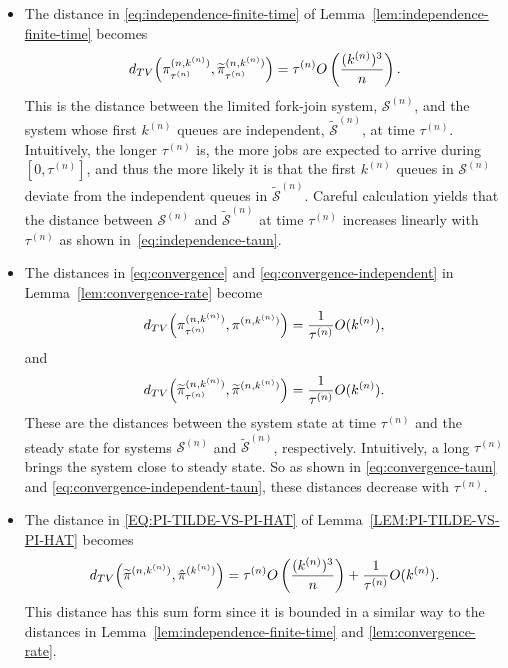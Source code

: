 \documentclass[sigconf]{acmart}
\newcommand{\supn}{^{(n)}}
\begin{document}
\begin{itemize}[leftmargin=1em]
\item The distance in \eqref{eq:independence-finite-time} of Lemma~\ref{lem:independence-finite-time} becomes
\begin{equation}\label{eq:independence-taun}
d_{TV}\Bigl(\pi_{\tau\supn}^{(n,k\supn)},\widetilde{\pi}_{\tau\supn}^{(n,k\supn)}\Bigr)=\tau\supn O\left(\frac{(k\supn)^3}{n}\right).
\end{equation}
This is the distance between the limited fork-join system, $\mathcal{S}\supn$, and the system whose first $k\supn$ queues are independent, $\widetilde{\mathcal{S}}\supn$, at time $\tau\supn$. Intuitively, the longer $\tau\supn$ is, the more jobs are expected to arrive during $[0,\tau\supn]$, and thus the more likely it is that the first $k\supn$ queues in $\mathcal{S}\supn$ deviate from the independent queues in $\widetilde{\mathcal{S}}\supn$.  Careful calculation yields that the distance between $\mathcal{S}\supn$ and $\widetilde{\mathcal{S}}\supn$ at time $\tau\supn$ increases linearly with $\tau\supn$ as shown in~\eqref{eq:independence-taun}.

\item The distances in \eqref{eq:convergence} and \eqref{eq:convergence-independent} in Lemma~\ref{lem:convergence-rate} become
\begin{equation}\label{eq:convergence-taun}
d_{TV}\Bigl(\pi_{\tau\supn}^{(n,k\supn)},\pi^{(n,k\supn)}\Bigr)=\frac{1}{\tau\supn}O(k\supn),
\end{equation}
and
\begin{equation}\label{eq:convergence-independent-taun}
d_{TV}\Bigl(\widetilde{\pi}_{\tau\supn}^{(n,k\supn)},\widetilde{\pi}^{(n,k\supn)}\Bigr)=\frac{1}{\tau\supn}O(k\supn).
\end{equation}
These are the distances between the system state at time $\tau\supn$ and the steady state for systems $\mathcal{S}\supn$ and $\widetilde{\mathcal{S}}\supn$, respectively. Intuitively, a long $\tau\supn$ brings the system close to steady state. So as shown in \eqref{eq:convergence-taun} and \eqref{eq:convergence-independent-taun}, these distances decrease with $\tau\supn$.


\item The distance in \eqref{EQ:PI-TILDE-VS-PI-HAT} of Lemma~\ref{LEM:PI-TILDE-VS-PI-HAT} becomes
\begin{equation}\label{EQ:PI-TILDE-VS-PI-HAT-TAUN}
d_{TV}\Bigl(\widetilde{\pi}^{(n,k\supn)},\hat{\pi}^{(k\supn)}\Bigr)=\tau\supn O\left(\frac{(k\supn)^3}{n}\right)+\frac{1}{\tau\supn}O(k\supn).
\end{equation}
This distance has this sum form since it is bounded in a similar way to the distances in Lemma~\ref{lem:independence-finite-time} and \ref{lem:convergence-rate}.
\end{itemize}
\end{document}
